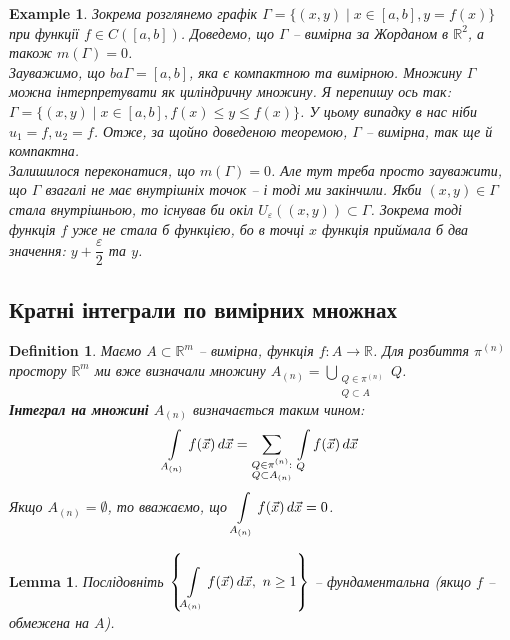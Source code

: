 \documentclass[a4paper, 10pt]{article}
\theoremstyle{theoremdd}
\theoremstyle{theoremdd}
\newtheorem{definition}[theorem]{Definition}
\theoremstyle{theoremdd}
\theoremstyle{theoremdd}
\theoremstyle{theoremdd}
\newtheorem{example}[theorem]{Example}
\theoremstyle{theoremdd}
\theoremstyle{theoremdd}
\theoremstyle{theoremdd}
\theoremstyle{theoremdd}
\theoremstyle{theoremdd}
\theoremstyle{theoremdd}
\theoremstyle{theoremdd}
\theoremstyle{theoremdd}
\newtheorem{lemma}[theorem]{Lemma}
\theoremstyle{theoremdd}
\theoremstyle{theoremdd}
\begin{document}
\begin{example}
Зокрема розглянемо графік $\Gamma = \{(x,y) \mid x \in [a,b], y = f(x)\}$ при функції $f \in C([a,b])$. Доведемо, що $\Gamma$ -- вимірна за Жорданом в $\mathbb{R}^2$, а також $m(\Gamma) = 0$.\\
Зауважимо, що $ba \Gamma = [a,b]$, яка є компактною та вимірною. Множину $\Gamma$ можна інтерпретувати як циліндричну множину. Я перепишу ось так: $\Gamma = \{(x,y) \mid x \in [a,b], f(x) \leq y \leq f(x)\}$. У цьому випадку в нас ніби $u_1 = f, u_2 = f$. Отже, за щойно доведеною теоремою, $\Gamma$ -- вимірна, так ще й компактна. \\
Залишилося переконатися, що $m(\Gamma) = 0$. Але тут треба просто зауважити, що $\Gamma$ взагалі не має внутрішніх точок -- і тоді ми закінчили. Якби $(x,y) \in \Gamma$ стала внутрішньою, то існував би окіл $U_{\varepsilon}((x,y)) \subset \Gamma$. Зокрема тоді функція $f$ уже не стала б функцією, бо в точці $x$ функція приймала б два значення: $y + \dfrac{\varepsilon}{2}$ та $y$.
\end{example}

\subsection{Кратні інтеграли по вимірних множнах}
\begin{definition}
Маємо $A \subset \mathbb{R}^m$ -- вимірна, функція $f \colon A \to \mathbb{R}$. Для розбиття $\pi^{(n)}$ простору $\mathbb{R}^m$ ми вже визначали множину $A_{(n)} = \displaystyle\bigcup_{\substack{Q \in \pi^{(n)} \\ Q \subset A}} Q$.\\
\textbf{Інтеграл на множині} $A_{(n)}$ визначається таким чином:
\begin{align*}
\int\displaylimits_{A_{(n)}} f(\vec{x})\,d\vec{x} = \sum_{\substack{Q \in \pi^{(n)}: \\ Q \subset A_{{(n)}}}}\, \int\displaylimits_Q f(\vec{x})\,d\vec{x}
\end{align*}
Якщо $A_{(n)} = \emptyset$, то вважаємо, що $\displaystyle\int\displaylimits_{A_{(n)}} f(\vec{x})\,d\vec{x} = 0$.
\end{definition}

\begin{lemma}
Послідовніть $\displaystyle\left\{ \int\displaylimits_{A_{(n)}} f(\vec{x})\,d\vec{x},\ n \geq 1 \right\}$ -- фундаментальна (якщо $f$ -- обмежена на $A$).
\end{lemma}
\end{document}
